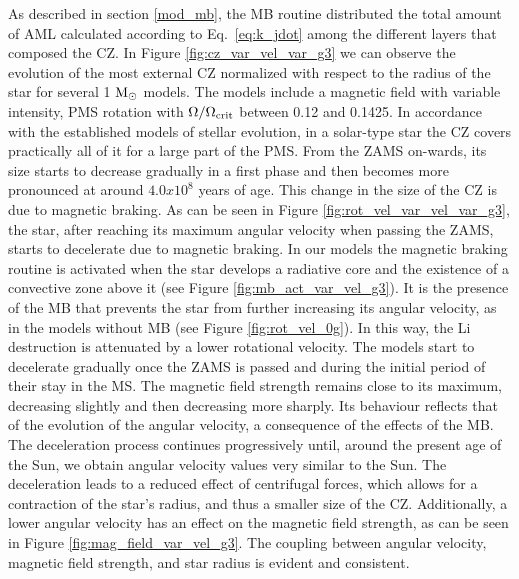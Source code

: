 \documentclass[fleqn,usenatbib]{mnras}
\begin{document}
As described in section \ref{mod_mb}, the MB routine distributed the total amount of AML calculated according to Eq.~\ref{eq:k_jdot} among the different layers that composed the CZ. In Figure \ref{fig:cz_var_vel_var_g3} we can observe the evolution of the most external CZ normalized with respect to the radius of the star for several 1 $\mathrm{M}_\odot$ models. The models include a magnetic field with variable intensity, PMS rotation with $\Omega / \Omega_{\mathrm{crit}}$ between 0.12 and 0.1425. In accordance with the established models of stellar evolution, in a solar-type star the CZ covers practically all of it for a large part of the PMS. From the ZAMS on-wards, its size starts to decrease gradually in a first phase and then becomes more pronounced at around $4.0x10^8$ years of age. This change in the size of the CZ is due to magnetic braking. As can be seen in Figure \ref{fig:rot_vel_var_vel_var_g3}, the star, after reaching its maximum angular velocity when passing the ZAMS, starts to decelerate due to magnetic braking. In our models the magnetic braking routine is activated when the star develops a radiative core and the existence of a convective zone above it (see Figure \ref{fig:mb_act_var_vel_g3}). It is the presence of the MB that prevents the star from further increasing its angular velocity, as in the models without MB (see Figure \ref{fig:rot_vel_0g}). In this way, the Li destruction is attenuated by a lower rotational velocity. The models start to decelerate gradually once the ZAMS is passed and during the initial period of their stay in the MS. The magnetic field strength remains close to its maximum, decreasing slightly and then decreasing more sharply. Its behaviour reflects that of the evolution of the angular velocity, a consequence of the effects of the MB. The deceleration process continues progressively until, around the present age of the Sun, we obtain angular velocity values very similar to the Sun. The deceleration leads to a reduced effect of centrifugal forces, which allows for a contraction of the star's radius, and thus a smaller size of the CZ. Additionally, a lower angular velocity has an effect on the magnetic field strength, as can be seen in Figure \ref{fig:mag_field_var_vel_g3}. The coupling between angular velocity, magnetic field strength, and star radius is evident and consistent.\par
\end{document}
